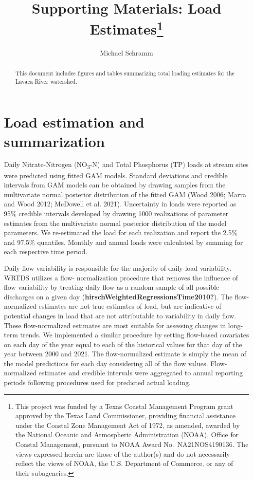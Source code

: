 \documentclass[
]{article}
\title{Supporting Materials: Load Estimates\thanks{This project was
funded by a Texas Coastal Management Program grant approved by the Texas
Land Commissioner, providing financial assistance under the Coastal Zone
Management Act of 1972, as amended, awarded by the National Oceanic and
Atmospheric Administration (NOAA), Office for Coastal Management,
pursuant to NOAA Award No.~NA21NOS4190136. The views expressed herein
are those of the author(s) and do not necessarily reflect the views of
NOAA, the U.S. Department of Commerce, or any of their subagencies.}}
\author{Michael Schramm}
\date{}
\begin{document}
\maketitle
\begin{abstract}
This document includes figures and tables summarizing total loading
estimates for the Lavaca River watershed.
\end{abstract}
\ifdefined\Shaded\renewenvironment{Shaded}{\begin{tcolorbox}[frame hidden, boxrule=0pt, borderline west={3pt}{0pt}{shadecolor}, sharp corners, interior hidden, enhanced, breakable]}{\end{tcolorbox}}\fi

\hypertarget{load-estimation-and-summarization}{%
\section{Load estimation and
summarization}\label{load-estimation-and-summarization}}

Daily Nitrate-Nitrogen (NO\textsubscript{3}-N) and Total Phosphorus (TP)
loads at stream sites were predicted using fitted GAM models. Standard
deviations and credible intervals from GAM models can be obtained by
drawing samples from the multivariate normal posterior distribution of
the fitted GAM (Wood 2006; Marra and Wood 2012; McDowell et al. 2021).
Uncertainty in loads were reported as 95\% credible intervals developed
by drawing 1000 realizations of parameter estimates from the
multivariate normal posterior distribution of the model parameters. We
re-estimated the load for each realization and report the 2.5\% and
97.5\% quantiles. Monthly and annual loads were calculated by summing
for each respective time period.

Daily flow variability is responsible for the majority of daily load
variability. WRTDS utilizes a flow- normalization procedure that removes
the influence of flow variability by treating daily flow as a random
sample of all possible discharges on a given day
(\textbf{hirschWeightedRegressionsTime2010?}). The flow-normalized
estimates are not true estimates of load, but are indicative of
potential changes in load that are not attributable to variability in
daily flow. These flow-normalized estimates are most suitable for
assessing changes in long-term trends. We implemented a similar
procedure by setting flow-based covariates on each day of the year equal
to each of the historical values for that day of the year between 2000
and 2021. The flow-normalized estimate is simply the mean of the model
predictions for each day considering all of the flow values.
Flow-normalized estimates and credible intervals were aggregated to
annual reporting periods following procedures used for predicted actual
loading.
\end{document}
